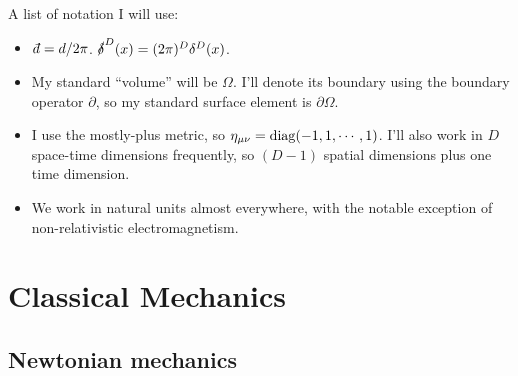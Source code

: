 \documentclass[11pt]{article}
\begin{document}
\begin{reemark}
    A list of notation I will use:
    \begin{itemize}
        \item $\dbar = d/2\pi$. $\sl{\delta}^D(x) = (2\pi)^D \delta^D(x)$.
        \item My standard ``volume'' will be $\Omega$. I'll denote its boundary
        using the boundary operator $\partial$, so my standard surface element
        is $\partial \Omega$.
        \item I use the mostly-plus metric, so $\eta_{\mu \nu} = \diag(-1, 1, \cdots, 1)$.
        I'll also work in $D$ space-time dimensions frequently, so $(D - 1)$
        spatial dimensions plus one time dimension.
        \item We work in natural units almost everywhere, with the notable exception
        of non-relativistic electromagnetism.
    \end{itemize}
\end{reemark}

\newpage
\microtoc
\newpage

\section{Classical Mechanics}

\subsection{Newtonian mechanics}


\end{document}
